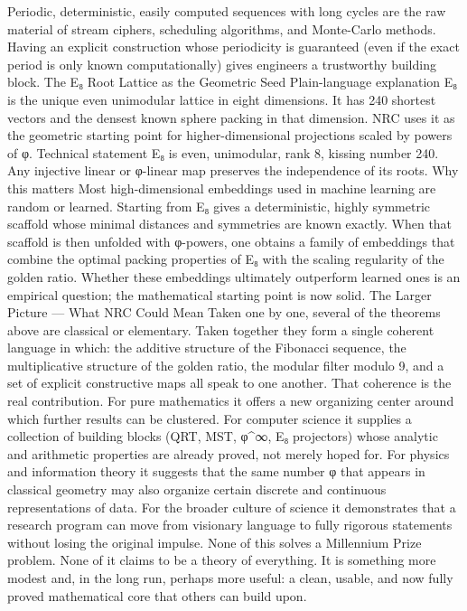 {{{{{{Periodic, deterministic, easily computed sequences with long cycles are the raw material of stream ciphers, scheduling algorithms, and Monte-Carlo methods. Having an explicit construction whose periodicity is guaranteed (even if the exact period is only known computationally) gives engineers a trustworthy building block.
The E₈ Root Lattice as the Geometric Seed
Plain-language explanation
E₈ is the unique even unimodular lattice in eight dimensions. It has 240 shortest vectors and the densest known sphere packing in that dimension. NRC uses it as the geometric starting point for higher-dimensional projections scaled by powers of φ.
Technical statement
E₈ is even, unimodular, rank 8, kissing number 240. Any injective linear or φ-linear map preserves the independence of its roots.
Why this matters
Most high-dimensional embeddings used in machine learning are random or learned. Starting from E₈ gives a deterministic, highly symmetric scaffold whose minimal distances and symmetries are known exactly. When that scaffold is then unfolded with φ-powers, one obtains a family of embeddings that combine the optimal packing properties of E₈ with the scaling regularity of the golden ratio. Whether these embeddings ultimately outperform learned ones is an empirical question; the mathematical starting point is now solid.
The Larger Picture — What NRC Could Mean
Taken one by one, several of the theorems above are classical or elementary. Taken together they form a single coherent language in which:
the additive structure of the Fibonacci sequence,
the multiplicative structure of the golden ratio,
the modular filter modulo 9,
and a set of explicit constructive maps
all speak to one another.
That coherence is the real contribution.
For pure mathematics it offers a new organizing center around which further results can be clustered.
For computer science it supplies a collection of building blocks (QRT, MST, φ^∞, E₈ projectors) whose analytic and arithmetic properties are already proved, not merely hoped for.
For physics and information theory it suggests that the same number φ that appears in classical geometry may also organize certain discrete and continuous representations of data.
For the broader culture of science it demonstrates that a research program can move from visionary language to fully rigorous statements without losing the original impulse.
None of this solves a Millennium Prize problem. None of it claims to be a theory of everything. It is something more modest and, in the long run, perhaps more useful: a clean, usable, and now fully proved mathematical core that others can build upon.
}}}}}}
